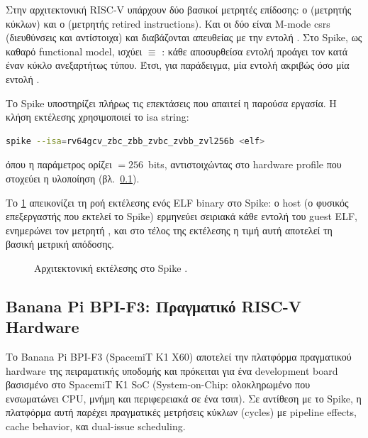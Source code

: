 Στην αρχιτεκτονική RISC-V υπάρχουν δύο βασικοί μετρητές επίδοσης: ο 
(μετρητής κύκλων) και ο  (μετρητής retired instructions). Και οι δύο είναι
M-mode \glspl{csr} (διευθύνσεις  και  αντίστοιχα) και διαβάζονται
απευθείας με την εντολή . Στο Spike,
ως καθαρό functional model, ισχύει  $\equiv$ : κάθε αποσυρθείσα
εντολή προάγει τον  κατά έναν κύκλο ανεξαρτήτως τύπου. Έτσι, για παράδειγμα, μία εντολή
\vclmul{}  ακριβώς όσο μία εντολή .

Το Spike υποστηρίζει πλήρως τις επεκτάσεις που απαιτεί η παρούσα εργασία. Η
κλήση εκτέλεσης χρησιμοποιεί το \gls{isa} string:

\begin{lstlisting}[language=bash, basicstyle=\ttfamily\small, breaklines=true]
spike --isa=rv64gcv_zbc_zbb_zvbc_zvbb_zvl256b <elf>
\end{lstlisting}

\noindent
όπου η παράμετρος  ορίζει \VLEN $= \num{256}$~bits, αντιστοιχώντας
στο hardware profile που στοχεύει η υλοποίηση (βλ.~\cref{ssec:bpi-f3}).

Το \cref{fig:spike-arch} απεικονίζει τη ροή εκτέλεσης ενός ELF binary στο Spike:
ο host (ο φυσικός επεξεργαστής που εκτελεί το Spike) ερμηνεύει σειριακά κάθε εντολή
του guest ELF, ενημερώνει τον μετρητή , και στο τέλος της εκτέλεσης η
τιμή αυτή αποτελεί τη βασική μετρική απόδοσης.

\begin{figure}[htbp]
  \centering
  \resizebox{0.92\textwidth}{!}{}
  \caption[Αρχιτεκτονική εκτέλεσης στο Spike ISS]{Αρχιτεκτονική εκτέλεσης στο Spike .}
  \label{fig:spike-arch}
\end{figure}

\subsection{Banana Pi BPI-F3: Πραγματικό RISC-V Hardware}
\label{ssec:bpi-f3}

Το Banana Pi BPI-F3 (SpacemiT K1 X60) αποτελεί την πλατφόρμα πραγματικού 
hardware της πειραματικής υποδομής και πρόκειται για ένα development board βασισμένο στο 
SpacemiT K1 SoC (System-on-Chip: ολοκληρωμένο που ενσωματώνει CPU, 
μνήμη και περιφερειακά σε ένα τσιπ). Σε αντίθεση με το Spike, η 
πλατφόρμα αυτή παρέχει πραγματικές μετρήσεις κύκλων (cycles) με 
pipeline effects, cache behavior, και dual-issue scheduling.

